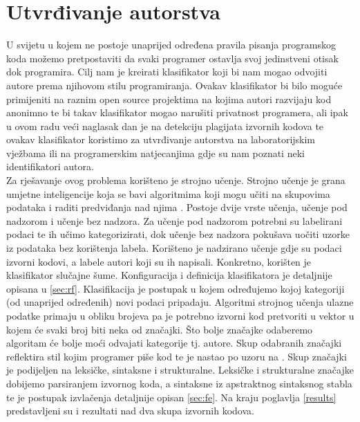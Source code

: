 \chapter{Utvrđivanje autorstva}
U svijetu u kojem ne postoje unaprijed određena pravila pisanja programskog koda možemo pretpostaviti da svaki programer ostavlja svoj jedinstveni otisak dok programira. Cilj nam je kreirati klasifikator koji bi nam mogao odvojiti autore prema njihovom stilu programiranja. Ovakav klasifikator bi bilo moguće primijeniti na raznim open source projektima na kojima autori razvijaju kod anonimno te bi takav klasifikator mogao narušiti privatnost programera, ali ipak u ovom radu veći naglasak dan je na detekciju plagijata izvornih kodova te ovakav klasifikator koristimo za utvrđivanje autorstva na laboratorijskim vježbama ili na programerskim natjecanjima gdje su nam poznati neki identifikatori autora. \\

	Za rješavanje ovog problema korišteno je strojno učenje. Strojno učenje je grana umjetne inteligencije koja se bavi algoritmima koji mogu učiti na skupovima podataka i raditi predviđanja nad njima \cite{ml-def}. Postoje dvije vrste učenja, učenje pod nadzorom i učenje bez nadzora. Za učenje pod nadzorom potrebni su labelirani podaci te ih učimo kategorizirati, dok učenje bez nadzora pokušava uočiti uzorke iz podataka bez korištenja labela. Korišteno je nadzirano učenje gdje su podaci izvorni kodovi, a labele autori koji su ih napisali.  Konkretno, korišten je klasifikator slučajne šume. Konfiguracija i definicija klasifikatora je detaljnije opisana u \ref{sec:rf}. Klasifikacija je postupak u kojem određujemo kojoj kategoriji (od unaprijed određenih) novi podaci pripadaju. Algoritmi strojnog učenja ulazne podatke primaju u obliku brojeva pa je potrebno izvorni kod pretvoriti u vektor u kojem će svaki broj biti neka od značajki. Što bolje značajke odaberemo algoritam će bolje moći odvajati kategorije tj. autore. Skup odabranih značajki reflektira stil kojim programer piše kod te je nastao po uzoru na \cite{islam}. Skup značajki je podijeljen na leksičke, sintaksne i strukturalne.  Leksičke i strukturalne značajke dobijemo parsiranjem izvornog koda, a sintaksne iz apstraktnog sintaksnog stabla te je postupak izvlačenja detaljnije opisan \ref{sec:fe}. Na kraju poglavlja \ref{results} predstavljeni su i rezultati nad dva skupa izvornih kodova.

